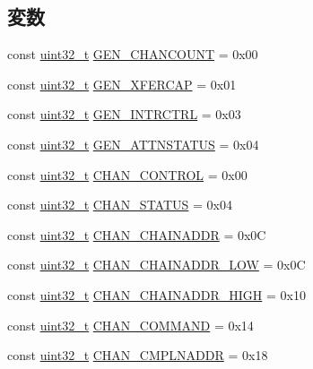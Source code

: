\subsection*{変数}
\begin{DoxyCompactItemize}
\item 
const \hyperlink{Type_8hh_a435d1572bf3f880d55459d9805097f62}{uint32\_\-t} \hyperlink{namespaceCopyEngineReg_a14c18458452291938d4152a65e037928}{GEN\_\-CHANCOUNT} = 0x00
\item 
const \hyperlink{Type_8hh_a435d1572bf3f880d55459d9805097f62}{uint32\_\-t} \hyperlink{namespaceCopyEngineReg_ac0068780087938924e6ad21074d945d9}{GEN\_\-XFERCAP} = 0x01
\item 
const \hyperlink{Type_8hh_a435d1572bf3f880d55459d9805097f62}{uint32\_\-t} \hyperlink{namespaceCopyEngineReg_abd37ea26b220f895c1d50b0b94654a23}{GEN\_\-INTRCTRL} = 0x03
\item 
const \hyperlink{Type_8hh_a435d1572bf3f880d55459d9805097f62}{uint32\_\-t} \hyperlink{namespaceCopyEngineReg_af80eb1e2939758c39cde1c3383b8a329}{GEN\_\-ATTNSTATUS} = 0x04
\item 
const \hyperlink{Type_8hh_a435d1572bf3f880d55459d9805097f62}{uint32\_\-t} \hyperlink{namespaceCopyEngineReg_ae83d13e861450d7a551762efdf316422}{CHAN\_\-CONTROL} = 0x00
\item 
const \hyperlink{Type_8hh_a435d1572bf3f880d55459d9805097f62}{uint32\_\-t} \hyperlink{namespaceCopyEngineReg_a76cf8c497537b1f830ed57b4bfeb4c04}{CHAN\_\-STATUS} = 0x04
\item 
const \hyperlink{Type_8hh_a435d1572bf3f880d55459d9805097f62}{uint32\_\-t} \hyperlink{namespaceCopyEngineReg_a5a66b3472d97177e315251d5167d3bf0}{CHAN\_\-CHAINADDR} = 0x0C
\item 
const \hyperlink{Type_8hh_a435d1572bf3f880d55459d9805097f62}{uint32\_\-t} \hyperlink{namespaceCopyEngineReg_a274d905bf3d7e52cd2c1488a6215c11f}{CHAN\_\-CHAINADDR\_\-LOW} = 0x0C
\item 
const \hyperlink{Type_8hh_a435d1572bf3f880d55459d9805097f62}{uint32\_\-t} \hyperlink{namespaceCopyEngineReg_a2accc1f83257729ca7e6509ca4912063}{CHAN\_\-CHAINADDR\_\-HIGH} = 0x10
\item 
const \hyperlink{Type_8hh_a435d1572bf3f880d55459d9805097f62}{uint32\_\-t} \hyperlink{namespaceCopyEngineReg_ae8c00cf31e7ee4497a99b60a2a1f1940}{CHAN\_\-COMMAND} = 0x14
\item 
const \hyperlink{Type_8hh_a435d1572bf3f880d55459d9805097f62}{uint32\_\-t} \hyperlink{namespaceCopyEngineReg_a105aff5782e20230e52fff690e6cdb99}{CHAN\_\-CMPLNADDR} = 0x18

\end{DoxyCompactItemize}
